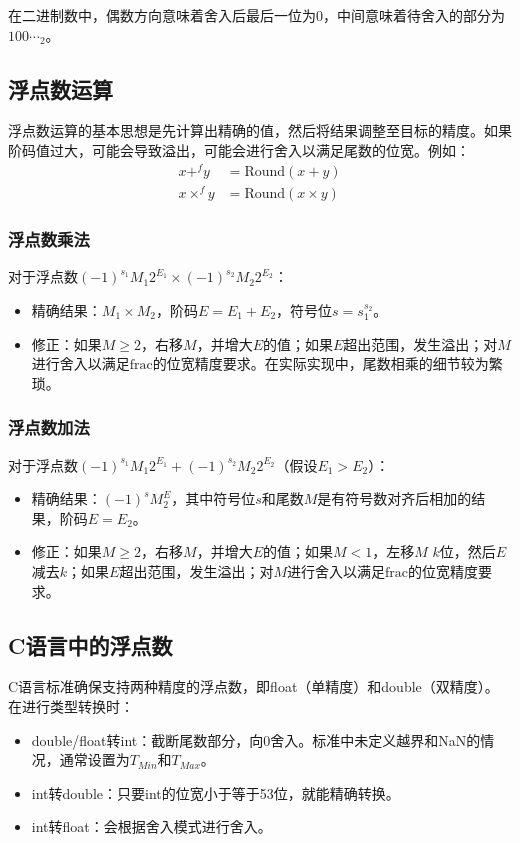 在二进制数中，偶数方向意味着舍入后最后一位为0，中间意味着待舍入的部分为\(100\cdots_{2}\)。

\subsection{浮点数运算}
浮点数运算的基本思想是先计算出精确的值，然后将结果调整至目标的精度。如果阶码值过大，可能会导致溢出，可能会进行舍入以满足尾数的位宽。例如：
\begin{align*}
    x+^{f}y      & =\text{Round}(x + y)     \\
    x\times^{f}y & =\text{Round}(x\times y)
\end{align*}

\subsubsection{浮点数乘法}
对于浮点数\((-1)^{s_1}M_1 2^{E_1}\times(-1)^{s_2}M_2 2^{E_2}\)：
\begin{itemize}
    \item 精确结果：\(M_1\times M_2\)，阶码\(E = E_1 + E_2\)，符号位\(s = s_1^{s_2}\)。
    \item 修正：如果\(M\geq2\)，右移\(M\)，并增大\(E\)的值；如果\(E\)超出范围，发生溢出；对\(M\)进行舍入以满足\(\text{frac}\)的位宽精度要求。在实际实现中，尾数相乘的细节较为繁琐。
\end{itemize}

\subsubsection{浮点数加法}
对于浮点数\((-1)^{s_1}M_1 2^{E_1}+(-1)^{s_2}M_2 2^{E_2}\)（假设\(E_1>E_2\)）：
\begin{itemize}
    \item 精确结果：\((-1)^{s}M_2^{E}\)，其中符号位\(s\)和尾数\(M\)是有符号数对齐后相加的结果，阶码\(E = E_2\)。
    \item 修正：如果\(M\geq2\)，右移\(M\)，并增大\(E\)的值；如果\(M<1\)，左移\(M\) \(k\)位，然后\(E\)减去\(k\)；如果\(E\)超出范围，发生溢出；对\(M\)进行舍入以满足\(\text{frac}\)的位宽精度要求。
\end{itemize}

\subsection{C语言中的浮点数}
C语言标准确保支持两种精度的浮点数，即float（单精度）和double（双精度）。在进行类型转换时：
\begin{itemize}
    \item double/float转int：截断尾数部分，向0舍入。标准中未定义越界和NaN的情况，通常设置为\(T_{Min}\)和\(T_{Max}\)。
    \item int转double：只要int的位宽小于等于53位，就能精确转换。
    \item int转float：会根据舍入模式进行舍入。
\end{itemize}

